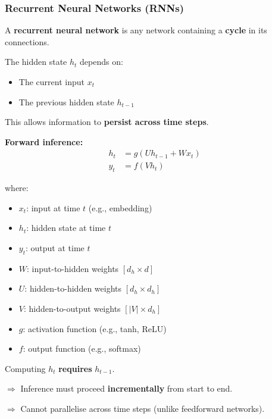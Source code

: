 \bigseparator

\subsubsection{Recurrent Neural Networks (RNNs)}

\begin{defbox}
A \textbf{recurrent neural network} is any network containing a \textbf{cycle} in its connections.

The hidden state $h_t$ depends on:
\begin{itemize}
  \item The current input $x_t$
  \item The previous hidden state $h_{t-1}$
\end{itemize}

This allows information to \textbf{persist across time steps}.
\end{defbox}

\begin{defbox}
\textbf{Forward inference:}
\begin{align*}
h_t &= g(U h_{t-1} + W x_t) \\
y_t &= f(V h_t)
\end{align*}

where:
\begin{itemize}
  \item $x_t$: input at time $t$ (e.g., embedding)
  \item $h_t$: hidden state at time $t$
  \item $y_t$: output at time $t$
  \item $W$: input-to-hidden weights $[d_h \times d]$
  \item $U$: hidden-to-hidden weights $[d_h \times d_h]$
  \item $V$: hidden-to-output weights $[|V| \times d_h]$
  \item $g$: activation function (e.g., tanh, ReLU)
  \item $f$: output function (e.g., softmax)
\end{itemize}
\end{defbox}

\begin{tipbox}
Computing $h_t$ \textbf{requires} $h_{t-1}$.

$\Rightarrow$ Inference must proceed \textbf{incrementally} from start to end.

$\Rightarrow$ Cannot parallelise across time steps (unlike feedforward networks).
\end{tipbox}

